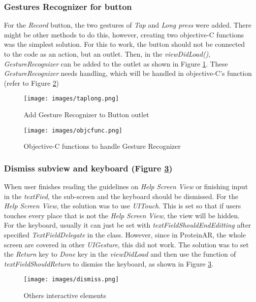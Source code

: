\subsubsection{Gestures Recognizer for button}
For the \emph{Record} button, the two gestures of \emph{Tap} and \emph{Long press} were added. There might be other methods to do this, however, creating two objective-C functions was the simplest solution. For this to work, the button should not be connected to the code as an action, but an outlet. Then, in the \emph{viewDidLoad()}, \emph{GestureRecognizer} can be added to the outlet as shown in Figure \ref{fig:taplong}. These \emph{GestureRecognizer} needs handling, which will be handled in objective-C’s function (refer to Figure \ref{fig:objcfunc})
\begin{figure}[!htp]
	\centering
	\texttt{[image: images/taplong.png]}
	\caption{Add Gesture Recognizer to Button outlet}
	\label{fig:taplong}
\end{figure}
\begin{figure}[!htp]
	\centering
	\texttt{[image: images/objcfunc.png]}
	\caption{Objective-C functions to handle Gesture Recognizer}
	\label{fig:objcfunc}
\end{figure}

\subsubsection{Dismiss subview and keyboard (Figure \ref{fig:dismiss})}
When user finishes reading the guidelines on \emph{Help Screen View} or finishing input in the \emph{textFied}, the sub-screen and the keyboard should be dismissed. For the \emph{Help Screen View}, the solution was to use \emph{UITouch}. This is set so that if users touches every place that is not the \emph{Help Screen View}, the view will be hidden. 
For the keyboard, usually it can just be set with \emph{textFieldShouldEndEditting} after specified \emph{TextFieldDelegate} in the class. However, since in ProteinAR, the whole screen are covered in other \emph{UIGesture}, this did not work. The solution was to set the \emph{Return} key to \emph{Done} key in the \emph{viewDidLoad} and then use the function of \emph{textFieldShouldReturn} to dismiss the keyboard, as shown in Figure \ref{fig:dismiss}.

\begin{figure}[!htp]
	\centering
	\texttt{[image: images/dismiss.png]}
	\caption{Others interactive elements}
	\label{fig:dismiss}
\end{figure}

